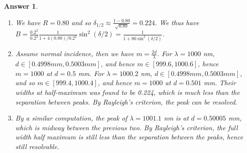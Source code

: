 \documentclass[a4paper]{article}
\newtheorem{ans}{Answer}[subsection]
\theoremstyle{new}
\begin{document}
\begin{ans}
\begin{enumerate}[label=(\roman*)]
\item We have $R=0.80$ and so $\delta_{1/2}\approx\frac{1-0.80}{\sqrt{0.80}}=0.224$. We thus have $B=\frac{0.2^2}{0.2^2}\frac{1}{1+4(0.80)/0.2^2}\sin^2(\delta/2)=\frac{1}{1+80\sin^2(\delta/2)}$.
\begin{center}
\end{center}
\item Assume normal incidence, then we have $m=\frac{2d}{\lambda}$. For $\lambda=1000$ nm, $d\in[0.4998mm, 0.5003mm]$, and hence $m\in[999.6,1000.6]$, hence $m=1000$ at $d=0.5$ mm. For $\lambda=1000.2$ nm, $d\in[0.4998mm,0.5003mm]$, and so $m\in[999.4,1000.4]$, and hence $m=1000$ at $d=0.501$ mm. Their widths at half-maximum was found to be 0.224, which is much less than the separation between peaks. By Rayleigh's criterion, the peak can be resolved.
\item By a similar computation, the peak of $\lambda=1001.1$ nm is at $d=0.50005$ mm, which is midway between the previous two. By Rayleigh's criterion, the full width half maximum is still less than the separation between the peaks, hence still resolvable.
\end{enumerate}
\end{ans}
\newpage
\end{document}
